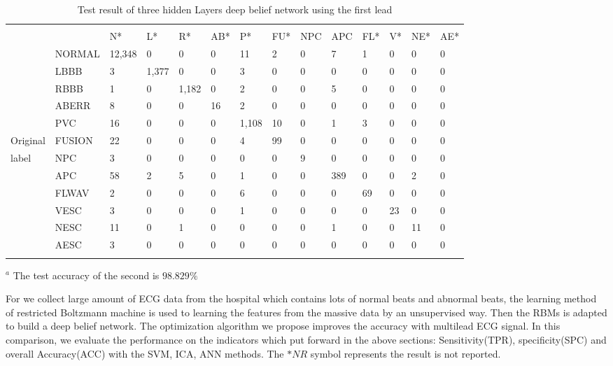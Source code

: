\documentclass[graybox]{svmult}
\begin{document}
\begin{table}
\caption{Test result of three hidden Layers deep belief network using the first lead}
\label{tab:9}  
\begin{tabular}{p{1cm}p{1.2cm}p{0.9cm}p{0.7cm}p{0.7cm}p{0.6cm}p{0.6cm}p{0.6cm}p{0.7cm}p{0.6cm}p{0.6cm}p{0.6cm}p{0.7cm}p{0.7cm}}
\hline\noalign{\smallskip}
\multicolumn{9}{r}{Algorithm classified label} \\
\noalign{\smallskip}\hline\noalign{\smallskip}
		 &      & N* & L* & R* & AB* & P* & FU* & NPC & APC & FL* & V* & NE*& AE*\\
\noalign{\smallskip}\svhline\noalign{\smallskip}
	 & NORMAL & 12,348& 0   &  0   &  0   &  11  &  2    &	0   &  7  &   1   &   0  &  0  &  0 \\
	     & LBBB   &  3    & 1,377&  0  &  0   &  3   &  0    &  0   &  0  &   0   &   0  &  0  &  0 \\
		 & RBBB   &  1    &  0  & 1,182&  0   &  2   &  0    &	0   &  5  &   0   &   0  &  0  &  0 \\
		 & ABERR  &  8    &  0  &  0   &  16  &  2   &  0    &	0   &  0  &   0   &   0  &  0  &  0 \\
		 & PVC    &  16   &  0  &  0   &  0   & 1,108&  10   &	0   &  1  &   3   &   0  &  0  &  0 \\
Original & FUSION &	 22   &  0  &  0   &  0   &  4   &   99  &	0   &  0  &   0   &   0  &  0  &  0 \\
label    & NPC    &	 3    &  0  &  0   &  0   &  0   &  0    &	9   &  0  &   0   &   0  &  0  &  0 \\
		 & APC    &	 58   &  2  &  5   &  0   &  1   &  0    &	0   &  389&   0   &   0  &  2  &  0 \\
		 & FLWAV  &	 2    &  0  &  0   &  0   &  6   &  0    &	0   &  0  &   69  &   0  &  0  &  0 \\
		 & VESC   &	 3    &  0  &  0   &  0   &  1   &  0    &	0   &  0  &   0   &  23  &  0  &  0 \\
		 & NESC   &	 11   &  0  &  1   &  0   &  0   &  0    &	0   &  1  &   0   &   0  &  11 &  0 \\
		 & AESC   &	 3    &  0  &  0   &  0   &  0   &  0    &	0   &  0  &   0   &   0  &  0  &  0 \\
\noalign{\smallskip}\hline\noalign{\smallskip}
\end{tabular}
$^a$ The test accuracy of the second is $98.829\%$
\end{table}




For we collect large amount of ECG data from the hospital which contains lots of normal beats and abnormal beats, the learning method of restricted Boltzmann machine is used to learning the features from the massive data by an unsupervised way. Then the RBMs is adapted to build a deep belief network. The optimization algorithm we propose improves the accuracy with multilead ECG signal. In this comparison, we evaluate the performance on the indicators which put forward in the above sections: Sensitivity(TPR), specificity(SPC) and overall Accuracy(ACC) with the SVM, ICA, ANN methods. The $*NR$ symbol represents the result is not reported. 
\end{document}

